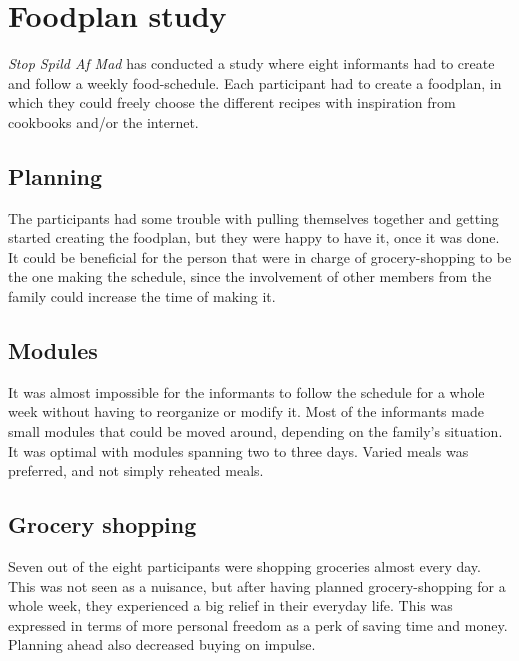 \section{Foodplan study}
\textit{Stop Spild Af Mad}\cite{madSpild_RapportAdfaerd} has conducted a study where eight informants had to create and follow a weekly food-schedule.
Each participant had to create a foodplan, in which they could freely choose the different recipes with inspiration from cookbooks and/or the internet.

\subsection*{Planning}
The participants had some trouble with pulling themselves together and getting started creating the foodplan, but they were happy to have it, once it was done. It could be beneficial for the person that were in charge of grocery-shopping to be the one making the schedule, since the involvement of other members from the family could increase the time of making it.

\subsection*{Modules}
It was almost impossible for the informants to follow the schedule for a whole week without having to reorganize or modify it. Most of the informants made small modules that could be moved around, depending on the family's situation. It was optimal with modules spanning two to three days. Varied meals was preferred, and not simply reheated meals.

\subsection*{Grocery shopping}
Seven out of the eight participants were shopping groceries almost every day. This was not seen as a nuisance, but after having planned grocery-shopping for a whole week, they experienced a big relief in their everyday life. This was expressed in terms of more personal freedom as a perk of saving time and money. Planning ahead also decreased buying on impulse.

